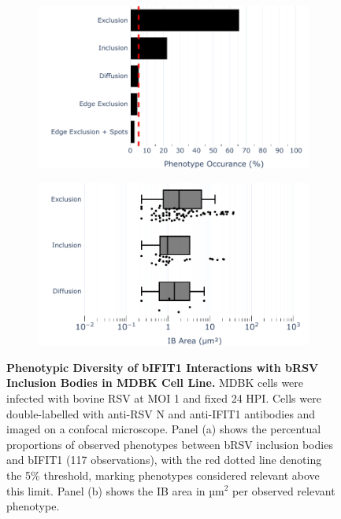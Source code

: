 \begin{figure}
    \begin{subfigure}{0.495\textwidth}
        \caption{}
        \includegraphics[width=1\linewidth]{08. Chapter 3/Figs/02. Infection/01. IFIT1/07. bar_i1_mdbk.pdf} 
    \end{subfigure}
    \begin{subfigure}{0.495\textwidth}
        \caption{}
        \includegraphics[width=1\linewidth]{08. Chapter 3/Figs/02. Infection/01. IFIT1/08. box_i1_mdbk.pdf}
    \end{subfigure}
    \caption[Phenotypic Diversity of bIFIT1 Interactions with bRSV Inclusion Bodies in MDBK Cell Line.]{\textbf{Phenotypic Diversity of bIFIT1 Interactions with bRSV Inclusion Bodies in MDBK Cell Line.} MDBK cells were infected with bovine RSV at MOI 1 and fixed 24 HPI. Cells were double-labelled with anti-RSV N and anti-IFIT1 antibodies and imaged on a confocal microscope. Panel (a) shows the percentual proportions of observed phenotypes between bRSV inclusion bodies and bIFIT1 (117 observations), with the red dotted line denoting the 5\% threshold, marking phenotypes considered relevant above this limit. Panel (b) shows the IB area in \(\mbox{µm}^2\) per observed relevant phenotype.}
    \label{fig:Phenotypic Diversity of bIFIT1 Interactions with bRSV Inclusion Bodies in MDBK Cell Line}
\end{figure}

